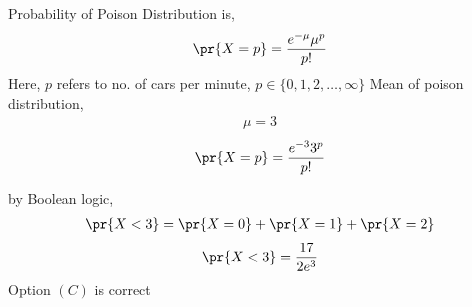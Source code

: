 
Probability of Poison Distribution is,
\begin{align}
    \pr{X=p}=\frac{e^{-\mu}\mu^p}{p!}
\end{align}
Here, $p$ refers to no. of cars per minute,
$p \in \{0,1,2,\dots,\infty\}$
Mean of poison distribution,
\begin{align}
    \mu=3
\end{align}
\begin{align}
    \pr{X=p}=\frac{e^{-3}3^p}{p!}
\end{align}
\begin{table}[h!]
\centering
\caption{Table of probability of no. of cars passing per minute}
\end{table}
by Boolean logic,
\begin{align}
    \pr{X<3}=\pr{X=0}+\pr{X=1}+\pr{X=2}
\end{align}
\begin{align}
    \pr{X<3}=\frac{17}{2e^3}
\end{align}
Option $(C)$ is correct